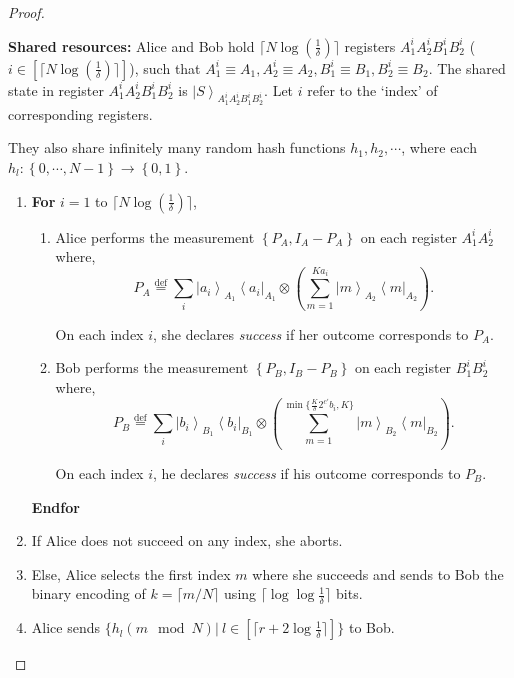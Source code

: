 \documentclass[11pt,a4paper]{article}
\theoremstyle{plain}
\theoremstyle{definition}
\newcommand {\defeq} {\ensuremath{ \stackrel{\mathrm{def}}{=} }}
\newcommand {\bra} [1] {\ensuremath{ \left\langle #1 \right| }}
\newcommand {\ket} [1] {\ensuremath{ \left| #1 \right\rangle }}
\newcommand {\set} [1] {\ensuremath{ \left\lbrace #1 \right\rbrace }}
\begin{document}
\begin{proof}
\begin{mdframed}
\textbf{Shared resources:} Alice and Bob hold $\lceil N\log(\frac{1}{\delta}) \rceil$ registers $A_1^iA_2^iB_1^iB_2^i$ ($i \in [\lceil N\log(\frac{1}{\delta}) \rceil]$), such that $A_1^i\equiv A_1, A^i_2\equiv A_2, B_1^i\equiv B_1,B_2^i\equiv B_2$. The shared state in register $A_1^iA_2^iB_1^iB_2^i$ is $\ket{S}_{A_1^iA_2^iB_1^iB_2^i}$. Let $i$ refer to the `index' of corresponding registers.

They also share infinitely many random hash functions $h_1,h_2,\cdots$, where each $h_l:\set{0,\cdots,N-1}\rightarrow\set{0,1}$.

\begin{enumerate}

\item \textbf{For} $i=1$ to $\lceil N\log(\frac{1}{\delta}) \rceil$,

\begin{enumerate}

\item Alice performs the measurement $\set{P_A,I_A- P_A}$ on each register $A_1^iA^i_2$ where,
\begin{equation}
\label{eq:aliceproj}
P_A\defeq\sum_i\ket{a_i}_{A_1}\bra{a_i}_{A_1}\otimes\left(\sum_{m=1}^{Ka_i}\ket{m}_{A_2}\bra{m}_{A_2}\right) .
\end{equation}

On each index $i$, she declares \textit{success} if her outcome corresponds to $P_A$.

\item Bob performs the measurement $\set{P_B,I_B- P_B}$ on each register $B_1^iB^i_2$ where,
\begin{equation}
\label{eq:bobproj}
P_B\defeq \sum_i\ket{b_i}_{B_1}\bra{b_i}_{B_1}\otimes\left(\sum_{m=1}^{\min\{\frac{K}{\delta} 2^{c'} b_i,K\}}\ket{m}_{B_2}\bra{m}_{B_2}\right) .
\end{equation}

On each index $i$, he declares \textit{success} if his outcome corresponds to $P_B$.
\end{enumerate}

\textbf{Endfor}

\item If Alice does not succeed on any index, she aborts.

\item Else, Alice selects the first index $m$ where she succeeds and sends to Bob the binary encoding of $k=\lceil m/N\rceil$ using $\lceil\log\log\frac{1}{\delta}\rceil$ bits.  

\item Alice sends $\{ h_l(m\mod N) |~ l \in  [\lceil r + 2\log\frac{1}{\delta}\rceil]\}$  to Bob.


\end{enumerate}
\end{mdframed}
\end{proof}
\end{document}
